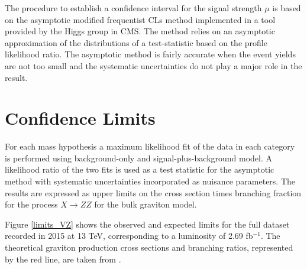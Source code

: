 The procedure to establish a confidence interval for the signal strength $\mu$ is based on the asymptotic modified frequentist CLs method \cite{Cowan:2010js} implemented in a tool provided by the Higgs group in CMS. The method relies on an asymptotic approximation of the distributions of a test-statistic based on the profile likelihood ratio. The asymptotic method is fairly accurate when the event yields are not too small and the systematic uncertainties do not play a major role in the result.

\section{Confidence Limits}
For each mass hypothesis a maximum likelihood fit of the data in each category is performed using background-only and signal-plus-background model. A likelihood ratio of the two fits is used as a test statistic for the asymptotic method with systematic uncertainties incorporated as nuisance parameters. The results are expressed as upper limits on the cross section times branching fraction for the process $X \rightarrow ZZ$ for the bulk graviton model. 

Figure \ref{limits_VZ} shows the observed and expected limits for the full dataset recorded in 2015 at 13 TeV, corresponding to a luminosity of 2.69 fb$^{-1}$. The theoretical graviton production cross sections and branching ratios, represented by the red line, are taken from \cite{Oliveira:2014kla}.


